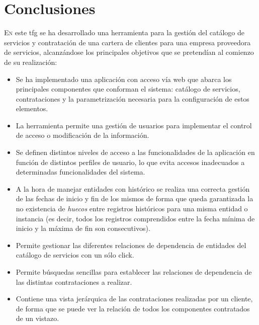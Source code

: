 \chapter{Conclusiones}
\label{chap:conclusiones}

\lettrine{E}{n} este \acrshort{tfg} se ha desarrollado una herramienta para la gestión del catálogo de servicios y contratación de una cartera de clientes para una empresa proveedora de servicios, alcanzándose los principales objetivos que se pretendían al comienzo de su realización:
\begin{itemize}
\item Se ha implementado una aplicación con acceso vía web que abarca los principales componentes que conforman el sistema: catálogo de servicios, contrataciones y la parametrización necesaria para la configuración de estos elementos.

\item La herramienta permite una gestión de usuarios para implementar el control de acceso o modificación de la información.

\item Se definen distintos niveles de acceso a las funcionalidades de la aplicación en función de distintos perfiles de usuario, lo que evita accesos inadecuados a determinadas funcionalidades del sistema.

\item A la hora de manejar entidades con histórico se realiza una correcta gestión de las fechas de inicio y fin de los mismos de forma que queda garantizada la no existencia de \textit{huecos} entre registros históricos para una misma entidad o instancia (es decir, todos los registros comprendidos entre la fecha mínima de inicio y la máxima de fin son consecutivos).

\item Permite gestionar las diferentes relaciones de dependencia de entidades del catálogo de servicios con un sólo click.

\item Permite búsquedas sencillas para establecer las relaciones de dependencia de las distintas contrataciones a realizar.

\item Contiene una vista jerárquica de las contrataciones realizadas por un cliente, de forma que se puede ver la relación de todos los componentes contratados de un vistazo.

\end{itemize}


